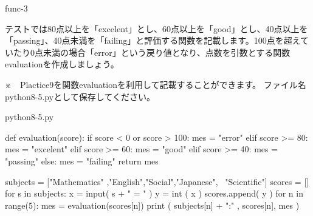 \documentclass[11pt,a4paper,dvipdfmx,titlepage]{jsreport}
\begin{document}
\begin{pabox}{func-3}

テストでは80点以上を「excelent」とし、60点以上を「good」とし、40点以上を「passing」、40点未満を「failing」と評価する関数を記載します。100点を超えていたり0点未満の場合「error」という戻り値となり、点数を引数とする関数evaluationを作成しましょう。

※　Plactice9を関数evaluationを利用して記載することができます。
ファイル名python8-5.pyとして保存してください。
\begin{codebox}{python8-5.py}
\begin{listing}{1}
def evaluation(score):
    if score < 0 or score > 100:
            mes = "error"
    elif score >= 80:
            mes = "excelent"
    elif score >= 60:
            mes = "good"
    elif score >= 40:
            mes = "passing"
    else:
            mes = "failing"
    return mes

subjects = ["Mathematics" ,"English","Social","Japanese", \
			"Scientific"]
scores = []
for s in subjects:
    x = input( s + " = " )
    y = int ( x )
    scores.append( y )
for n in range(5):
    mes = evaluation(scores[n])
    print ( subjects[n] + ":" , scores[n], mes )
\end{listing}
\end{codebox}
\end{pabox}
\end{document}
